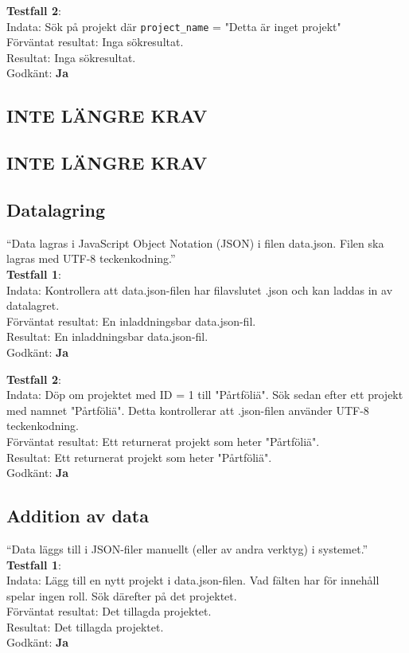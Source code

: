 \documentclass{TDP003mall}
\begin{document}
\textbf{Testfall 2}:\\
Indata: Sök på projekt där \verb|project_name| = "Detta är inget projekt"\\
Förväntat resultat: Inga sökresultat.\\
Resultat: Inga sökresultat.\\
Godkänt: \textbf{Ja}


\subsection{INTE LÄNGRE KRAV}

\subsection{INTE LÄNGRE KRAV}

\subsection{Datalagring}
“Data lagras i JavaScript Object Notation (JSON) i filen data.json. Filen ska lagras med UTF-8 teckenkodning.”\\
\textbf{Testfall 1}:\\
Indata: Kontrollera att data.json-filen har filavslutet .json och kan laddas in av datalagret.\\
Förväntat resultat: En inladdningsbar data.json-fil.\\
Resultat: En inladdningsbar data.json-fil.\\
Godkänt: \textbf{Ja}

\textbf{Testfall 2}: \\
Indata: Döp om projektet med ID = 1 till "Pårtföliä". Sök sedan efter ett projekt med namnet "Pårtföliä". Detta kontrollerar att .json-filen använder UTF-8 teckenkodning.\\
Förväntat resultat: Ett returnerat projekt som heter "Pårtföliä".\\
Resultat: Ett returnerat projekt som heter "Pårtföliä".\\
Godkänt: \textbf{Ja}


\subsection{Addition av data}
“Data läggs till i JSON-filer manuellt (eller av andra verktyg) i systemet.”\\
\textbf{Testfall 1}:\\
Indata: Lägg till en nytt projekt i data.json-filen. Vad fälten har för innehåll spelar ingen roll. Sök därefter på det projektet.\\
Förväntat resultat: Det tillagda projektet.\\
Resultat: Det tillagda projektet.\\
Godkänt: \textbf{Ja}
\end{document}
